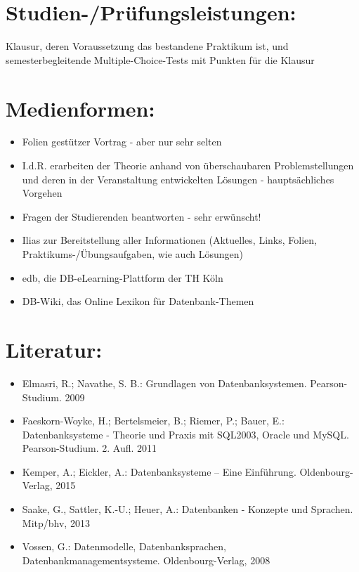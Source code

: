 \section*{Studien-/Prüfungsleistungen:}\label{studien-pruxfcfungsleistungen-6}

Klausur, deren Voraussetzung das bestandene Praktikum ist, und
semesterbegleitende Multiple-Choice-Tests mit Punkten für die Klausur

\section*{Medienformen:}\label{medienformen-4}

\begin{itemize}
\tightlist
\item
  Folien gestützer Vortrag - aber nur sehr selten
\item
  I.d.R. erarbeiten der Theorie anhand von überschaubaren
  Problemstellungen und deren in der Veranstaltung entwickelten Lösungen
  - hauptsächliches Vorgehen
\item
  Fragen der Studierenden beantworten - sehr erwünscht!
\item
  Ilias zur Bereitstellung aller Informationen (Aktuelles, Links,
  Folien, Praktikums-/Übungsaufgaben, wie auch Lösungen)
\item
  edb, die DB-eLearning-Plattform der TH Köln
\item
  DB-Wiki, das Online Lexikon für Datenbank-Themen
\end{itemize}

\section*{Literatur:}\label{literatur-5}

\begin{itemize}
\tightlist
\item
  Elmasri, R.; Navathe, S. B.: Grundlagen von Datenbanksystemen.
  Pearson-Studium. 2009
\item
  Faeskorn-Woyke, H.; Bertelsmeier, B.; Riemer, P.; Bauer, E.:
  Datenbanksysteme - Theorie und Praxis mit SQL2003, Oracle und MySQL.
  Pearson-Studium. 2. Aufl. 2011
\item
  Kemper, A.; Eickler, A.: Datenbanksysteme -- Eine Einführung.
  Oldenbourg-Verlag, 2015
\item
  Saake, G., Sattler, K.-U.; Heuer, A.: Datenbanken - Konzepte und
  Sprachen. Mitp/bhv, 2013
\item
  Vossen, G.: Datenmodelle, Datenbanksprachen,
  Datenbankmanagementsysteme. Oldenbourg-Verlag, 2008
\end{itemize}

